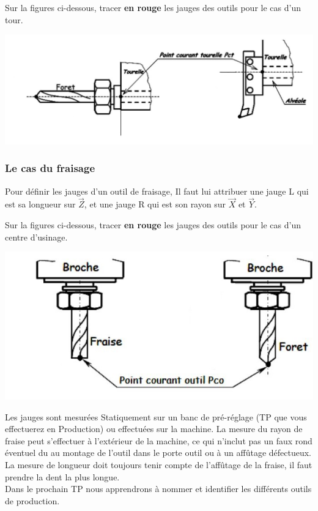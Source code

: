\documentclass[12pt]{article}
\newcounter{exo}
\newenvironment{exo}{\stepcounter{exo}\vspace{0.5cm}{\bfseries Question \theexo\ :}}{\par\vspace{0.5cm}}
\begin{document}
\begin{exo}\label{exo1} Sur la figures ci-dessous, tracer \textbf{en rouge} les jauges des outils pour le cas d'un tour.\end{exo}
\includegraphics[width=1.05\linewidth]{jauge1.JPG}


\subsubsection{Le cas du fraisage}
Pour définir les jauges d’un outil de fraisage, Il faut lui attribuer une jauge L qui est sa longueur sur $\vec{Z}$, et une jauge R qui est son rayon sur $\vec{X}$ et $\vec{Y}$.


\begin{exo}\label{exo1} Sur la figures ci-dessous, tracer \textbf{en rouge} les jauges des outils pour le cas d'un centre d'usinage.\end{exo}
\begin{center}
\includegraphics[width=0.8\linewidth]{jauge2.JPG}
\end{center}

Les jauges sont mesurées Statiquement sur un banc de pré-réglage (TP que vous effectuerez en Production) ou effectuées sur la machine. La mesure du rayon de fraise peut s’effectuer à l’extérieur de la machine, ce qui n’inclut pas un
faux rond éventuel du au montage de l’outil dans le porte outil ou à un affûtage défectueux. La mesure de longueur doit toujours tenir compte de l’affûtage de la fraise, il faut prendre la dent la plus longue.\\
Dans le prochain TP nous apprendrons à nommer et identifier les différents outils de production.
\end{document}
